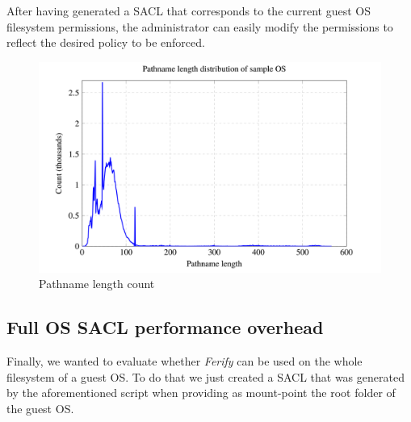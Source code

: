 \par After having generated a \ac{SACL} that corresponds to the current guest \ac{OS} filesystem permissions, the administrator can easily modify the permissions to reflect the desired policy to be enforced. 

\begin{figure}[ht]
	\centering
	\includegraphics[scale=0.45]{images/graph1.png}
	\caption{Pathname length count}
	\label{fig:pathname_length}
\end{figure}


\subsection{Full \ac{OS} \ac{SACL} performance overhead}

\par Finally, we wanted to evaluate whether \emph{Ferify} can be used on the whole filesystem of a guest \ac{OS}. To do that we just created a \ac{SACL} that was generated by the aforementioned script when providing as mount-point the root folder of the guest \ac{OS}.




